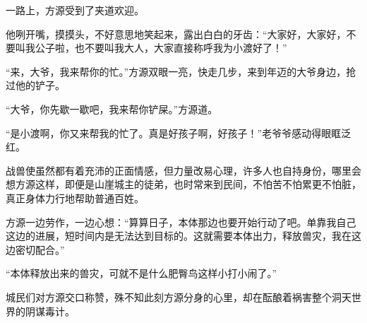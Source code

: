 \begin{this_body}
一路上，方源受到了夹道欢迎。

他咧开嘴，摸摸头，不好意思地笑起来，露出白白的牙齿：“大家好，大家好，不要叫我公子啦，也不要叫我大人，大家直接称呼我为小渡好了！”

“来，大爷，我来帮你的忙。”方源双眼一亮，快走几步，来到年迈的大爷身边，抢过他的铲子。

“大爷，你先歇一歇吧，我来帮你铲屎。”方源道。

“是小渡啊，你又来帮我的忙了。真是好孩子啊，好孩子！”老爷爷感动得眼眶泛红。

战兽使虽然都有着充沛的正面情感，但力量改易心理，许多人也自持身份，哪里会想方源这样，即便是山崖城主的徒弟，也时常来到民间，不怕苦不怕累更不怕脏，真正身体力行地帮助普通百姓。

方源一边劳作，一边心想：“算算日子，本体那边也要开始行动了吧。单靠我自己这边的进展，短时间内是无法达到目标的。这就需要本体出力，释放兽灾，我在这边密切配合。”

“本体释放出来的兽灾，可就不是什么肥臀鸟这样小打小闹了。”

城民们对方源交口称赞，殊不知此刻方源分身的心里，却在酝酿着祸害整个洞天世界的阴谋毒计。

\end{this_body}

